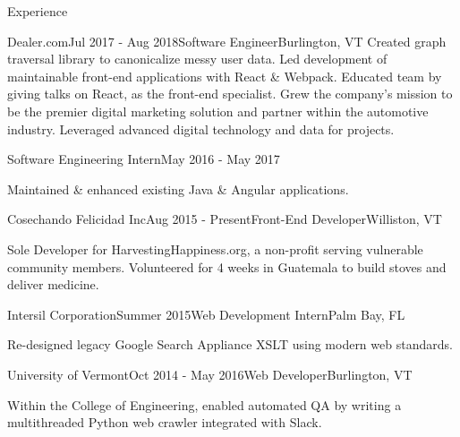 \documentclass{resume} %
\begin{document}
\begin{rSection}{Experience}
\begin{rSubsection}{Dealer.com}{Jul 2017 - Aug 2018}{Software Engineer}{Burlington, VT}
Created graph traversal library to canonicalize messy user data. Led development of
maintainable front-end applications with React \& Webpack. Educated team by giving talks
on React, as the front-end specialist. Grew the company’s mission to be the premier
digital marketing solution and partner within the automotive industry. Leveraged
advanced digital technology and data for projects.

\end{rSubsection}

\begin{sSubsection}{Software Engineering Intern}{May 2016 - May 2017}

Maintained \& enhanced existing Java \& Angular applications.

\end{sSubsection}


\begin{rSubsection}{Cosechando Felicidad Inc}{Aug 2015 - Present}{Front-End Developer}{Williston, VT}

Sole Developer for HarvestingHappiness.org, a non-profit serving vulnerable community members.
Volunteered for 4 weeks in Guatemala to build stoves and deliver medicine.

\end{rSubsection}


\begin{rSubsection}{Intersil Corporation}{Summer 2015}{Web Development Intern}{Palm Bay, FL}

Re-designed legacy Google Search Appliance XSLT using modern web standards.

\end{rSubsection}


\begin{rSubsection}{University of Vermont}{Oct 2014 - May 2016}{Web Developer}{Burlington, VT}

Within the College of Engineering, enabled automated QA by writing a multithreaded Python web
crawler integrated with Slack.

\end{rSubsection}

\end{rSection}
\end{document}
